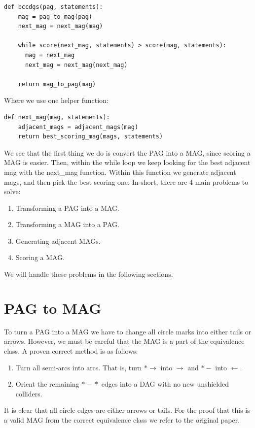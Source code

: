 \documentclass[11pt,a4paper]{report}
\begin{document}
\begin{lstlisting}
def bccdgs(pag, statements):
    mag = pag_to_mag(pag)
    next_mag = next_mag(mag)

    while score(next_mag, statements) > score(mag, statements):
      mag = next_mag
      next_mag = next_mag(next_mag)

    return mag_to_pag(mag)
\end{lstlisting}
Where we use one helper function:
\begin{lstlisting}
def next_mag(mag, statements):
    adjacent_mags = adjacent_mags(mag)
    return best_scoring_mag(mags, statements)
\end{lstlisting}
We see that the first thing we do is convert the PAG into a MAG, since
scoring a MAG is easier. Then, within the while loop we keep looking for
the best adjacent mag with the next\_mag function. Within this function we
generate adjacent mags, and then pick the best scoring one. In short,
there are 4 main problems to solve:
\begin{enumerate}
  \item Transforming a PAG into a MAG.

  \item Transforming a MAG into a PAG.

  \item Generating adjacent MAGs.

  \item Scoring a MAG.
\end{enumerate}
We will handle these problems in the following sections.

\section{PAG to MAG}
To turn a PAG into a MAG we have to change all circle marks into either
tails or arrows. However, we must be careful that the MAG is a part of the
equivalence class. A proven correct method is as follows:

\begin{enumerate}
  \item Turn all semi-arcs into arcs. That is, turn
    $*\!\!\!\rightarrow$ into $\rightarrow$ and
    $*\!-$ into $\leftarrow$.

  \item Orient the remaining $*\!\!\!-\!\!\!*$ edges into a DAG with no new unshielded
    colliders.
\end{enumerate}
It is clear that all circle edges are either arrows or tails. For the
proof that this is a valid MAG from the correct equivalence class we refer
to the original paper\cite{zhangCompletenessOrientationRules2008}.
\end{document}
